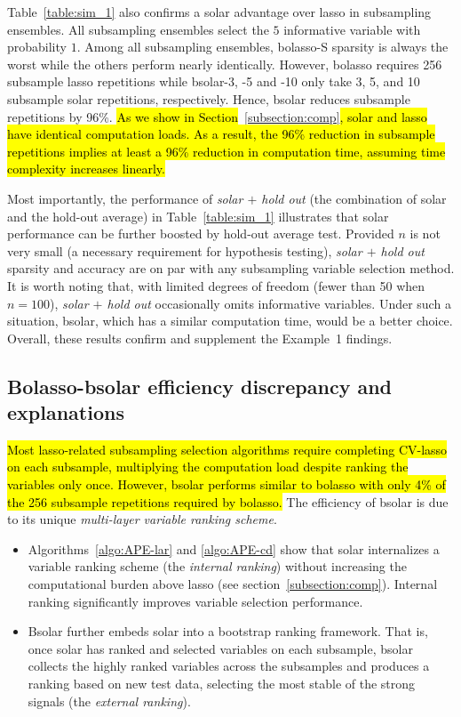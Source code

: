 \documentclass[11pt,review,authoryear]{elsarticle}
\begin{document}
Table~\ref{table:sim_1} also confirms a solar advantage over lasso in subsampling ensembles. All subsampling ensembles select the $5$ informative variable with probability $1$. Among all subsampling ensembles, bolasso-S sparsity is always the worst while the others perform nearly identically. However, bolasso requires 256 subsample lasso repetitions while bsolar-3, -5 and -10 only take 3, 5, and 10 subsample solar repetitions, respectively. Hence, bsolar reduces  subsample repetitions by 96\%. \hl{As we show in Section}~\ref{subsection:comp}\hl{, solar and lasso have identical computation loads. As a result, the 96\% reduction in subsample repetitions implies at least a 96\% reduction in computation time, assuming time complexity increases linearly.}

Most importantly, the performance of \emph{solar $+$ hold out} (the combination of solar and the hold-out average) in Table~\ref{table:sim_1} illustrates that solar performance can be further boosted by hold-out average test. Provided $n$ is not very small (a necessary requirement for hypothesis testing), \emph{solar $+$ hold out} sparsity and accuracy are on par with any subsampling variable selection method. It is worth noting that, with limited degrees of freedom (fewer than 50 when $n=100$), \emph{solar $+$ hold out} occasionally omits informative variables. Under such a situation, bsolar, which has a similar computation time, would be a better choice. Overall, these results confirm and supplement the Example~1 findings.

\subsection{Bolasso-bsolar efficiency discrepancy and explanations}

\hl{Most lasso-related subsampling selection algorithms require completing CV-lasso on each subsample, multiplying the computation load despite ranking the variables only once. However, bsolar performs similar to bolasso with only 4\% of the 256 subsample repetitions required by bolasso.} The efficiency of bsolar is due to its unique \emph{multi-layer variable ranking scheme}.

\begin{itemize}
  \item Algorithms~\ref{algo:APE-lar} and \ref{algo:APE-cd} show that solar internalizes a variable ranking scheme (the \emph{internal ranking}) without increasing the computational burden above lasso (see section~\ref{subsection:comp}). Internal ranking significantly improves variable selection performance.

  \item Bsolar further embeds solar into a bootstrap ranking framework. That is, once solar has ranked and selected variables on each subsample, bsolar collects the highly ranked variables across the subsamples and produces a ranking based on new test data, selecting the most stable of the strong signals (the \emph{external ranking}).
\end{itemize}
\end{document}
